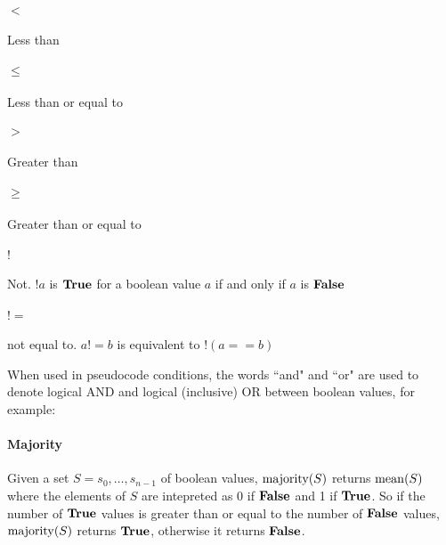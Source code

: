 \paragraph*{$<$}	Less than

\paragraph*{$\leq$} Less than or equal to

\paragraph*{$>$}	Greater than

\paragraph*{$\geq$} Greater than or equal to

\paragraph*{$!$} Not. $!a$ is $\text{\bf{True}}$ for a boolean value $a$ if and only if $a$ is $\text{\bf{False}}$

\paragraph*{$!=$} not equal to. $a!=b$ is equivalent to $!(a==b)$

When used in pseudocode conditions, the words ``and" and ``or" are used to denote logical AND
and logical (inclusive) OR between boolean values, for example:

\begin{pseudo*}
    \bsCODE{\hdots}
\bsEND
\end{pseudo*}

\paragraph*{Majority} Given a set $S=s_0, \hdots, s_{n-1}$ of boolean values, $\operatorname{majority}(S)$ 
returns $\operatorname{mean}(S)$ where the elements of $S$ are intepreted as $0$ if $\text{\bf{False}}$ and 1 if $\text{\bf{True}}$.
So if the number of $\text{\bf{True}}$ values is greater than or equal to the number of $\text{\bf{False}}$ values, $\operatorname{majority}(S)$ returns
$\text{\bf{True}}$, otherwise it returns $\text{\bf{False}}$.
